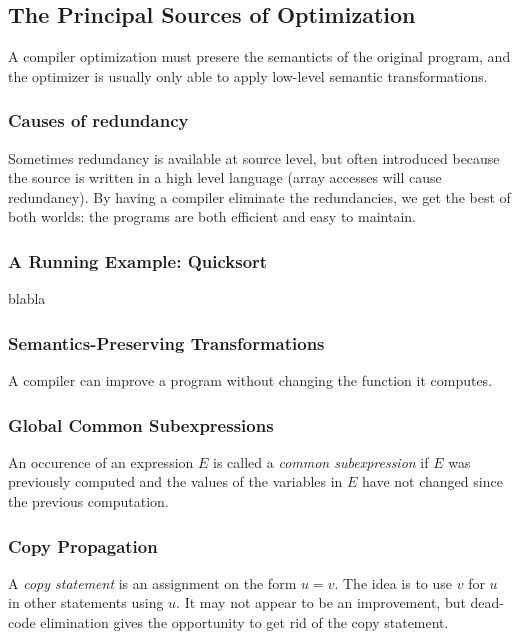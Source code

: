 \documentclass{article}
\begin{document}
\subsection{The Principal Sources of Optimization} %
\label{sub:The Principal Sources of Optimization}
A compiler optimization must presere the semanticts of the original program, and the optimizer is usually only able to apply low-level semantic transformations.

\subsubsection{Causes of redundancy} %
\label{ssub:Causes of redundancy}
Sometimes redundancy is available at source level, but often introduced because the source is written in a high level language (array accesses will cause redundancy). By having a compiler eliminate the redundancies, we get the best of both worlds: the programs are both efficient and easy to maintain.

\subsubsection{A Running Example: Quicksort} %
\label{ssub:A Running Example: Quicksort}
blabla

\subsubsection{Semantics-Preserving Transformations} %
\label{ssub:Semantics-Preserving Transformations}
A compiler can improve a program without changing the function it computes.

\subsubsection{Global Common Subexpressions} %
\label{ssub:Global Common Subexpressions}
An occurence of an expression $E$ is called a \emph{common subexpression} if $E$ was previously computed and the values of the variables in $E$ have not changed since the previous computation.

\subsubsection{Copy Propagation} %
\label{ssub:Copy Propagation}
A \emph{copy statement} is an assignment on the form $u = v$. The idea is to use $v$ for $u$ in other statements using $u$. It may not appear to be an improvement, but dead-code elimination gives the opportunity to get rid of the copy statement.
\end{document}
